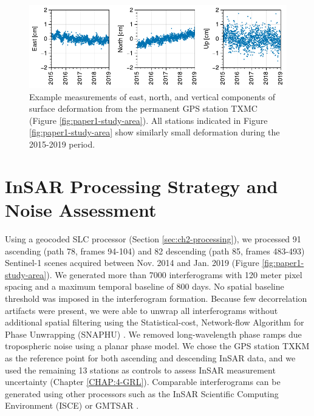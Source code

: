 \begin{figure}
	\centering
	\includegraphics[width=0.99\linewidth]{figures/chapter3-permian/gps-txmc.pdf}
	\caption[Example permanent GPS station measurements]{
		Example measurements of east, north, and vertical components of surface deformation from the permanent GPS station TXMC (Figure \ref{fig:paper1-study-area}). All stations indicated in Figure \ref{fig:paper1-study-area} show similarly small deformation during the 2015-2019 period.
	}
	\label{fig:ch3-gps}
\end{figure}


\FloatBarrier

\section{InSAR Processing Strategy and Noise Assessment}
\label{sec:ch3-insar-processing}

Using a geocoded SLC processor \citep{Zheng2017PhaseCorrectionSingle, Zebker2017UserFriendlyInsar} (Section \ref{sec:ch2-processing}), we processed 91 ascending (path 78, frames 94-104) and 82 descending (path 85, frames 483-493) Sentinel-1 scenes acquired between Nov. 2014 and Jan. 2019 (Figure \ref{fig:paper1-study-area}). We generated more than 7000 interferograms with 120 meter pixel spacing and a maximum temporal baseline of 800 days. No spatial baseline threshold was imposed in the interferogram formation. Because few decorrelation artifacts were present, we were able to unwrap all interferograms without additional spatial filtering using the Statistical-cost, Network-flow Algorithm for Phase Unwrapping (SNAPHU) \citep{Chen2001TwoDimensionalPhase}. We removed long-wavelength phase ramps due tropospheric noise using a planar phase model.
We chose the GPS station TXKM as the reference point for both ascending and descending InSAR data, and we used the remaining 13 stations as controls to assess InSAR measurement uncertainty (Chapter \ref{CHAP:4-GRL}).
Comparable interferograms can be generated using other processors such as the InSAR Scientific Computing Environment (ISCE) \citep{Rosen2012InsarScientificComputing} or GMTSAR \citep{Sandwell2011OpenRadarInterferometry}. 

